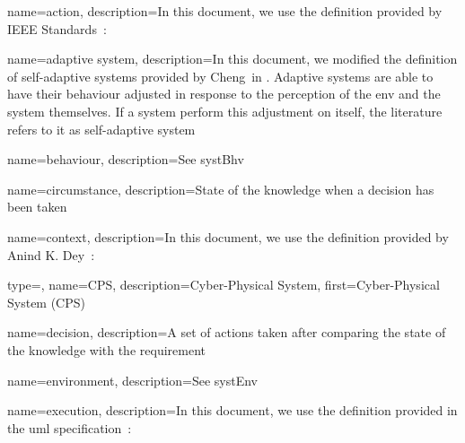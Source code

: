 {
	name={action},
	description={In this document, we use the definition provided by IEEE Standards~\cite{iso2017systems}: }
}

{
	name={adaptive system},
	description={In this document, we modified the definition of self-adaptive systems provided by Cheng~\etal in \cite{DBLP:conf/dagstuhl/ChengLGIMABBBCSDFGGGKKKLMMMPSTTWW09}. Adaptive systems are able to have their \gls{behaviour} adjusted in response to the perception of the \gls{env} and the system themselves. If a system perform this adjustment on itself, the literature refers to it as self-adaptive system}
}

{
	name={behaviour},
	description={See \gls{systBhv}}
}

{
	name={circumstance},
	description={State of the \gls{knowledge} when a \gls{decision} has been taken}
}

{
	name={context},
	description={In this document, we use the definition provided by Anind K. Dey~\cite{DBLP:journals/puc/Dey01}: }
}

{
	type=\acronymtype,
	name={CPS},
	description={Cyber-Physical System},
	first={Cyber-Physical System (CPS)}
}

{
	name={decision},
	description={A set of \glspl{action} taken after comparing the state of the \gls{knowledge} with the \gls{requirement}}
}

{
	name={environment},
	description={See \gls{systEnv}}
}

{
	name={execution},
	description={In this document, we use the definition provided in the \gls{uml} specification~\cite{omg2017umlspec}: }
}

